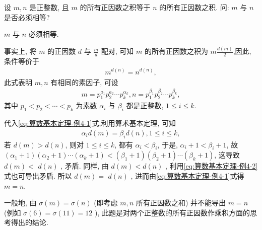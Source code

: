 \begin{example}
	设 $m ,  n$ 是正整数, 且 $m$ 的所有正因数之积等于 $n$ 的所有正因数之积. 问: $m$ 与 $n$ 是否必须相等?
\end{example}
\begin{solution}
	$m$ 与 $n$ 必须相等.

	事实上, 将 $m$ 的正因数 $d$ 与 $\frac{m}{d}$ 配对, 可知 $m$ 的所有正因数之积为 $m \frac{d(m)}{2}$,因此, 条件等价于
	\begin{align}\label{eq:算数基本定理-例4-1}
		m^{d(n)}=n^{d(n)},
	\end{align}
	此式表明 $m ,  n$ 有相同的素因子, 可设
	\begin{align*}
		m=p_{1}^{a_{1}} p_{2}^{a_{2}} \cdots p_{k}^{\alpha_{k}}, n=p_{1}^{\beta_{1}} p_{2}^{\beta_{2}} \cdots p_{k}^{\beta_{k}},
	\end{align*}
	其中 $p_{1}<p_{2}<\cdots<p_{k}$ 为素数 $\alpha_{i}$ 与 $\beta_{i}$ 都是正整数, $1 \leqslant i \leqslant k$.

	代入\ref{eq:算数基本定理-例4-1}式,利用算术基本定理, 可知
	\begin{align}\label{eq:算数基本定理-例4-2}
		\alpha_{i} d(m)=\beta_{i} d(n), 1 \leqslant i \leqslant k,
	\end{align}
	若 $d(m)>d(n)$, 则对 $1 \leqslant i \leqslant k$, 都有 $\alpha_{i}<\beta_{i}$, 于是, $\alpha_{i}+1<\beta_{i}+1$, 故 $\left(\alpha_{1}+1\right)\left(\alpha_{2}+1\right) \cdots\left(\alpha_{k}+1\right)<\left(\beta_{1}+1\right)\left(\beta_{2}+1\right) \cdots\left(\beta_{k}+1\right)$, 这导致 $d(m)<$ $d(n)$ , 矛盾. 同样, 由 $d(m)<d(n)$ , 利用\ref{eq:算数基本定理-例4-2}式也可导出矛盾. 所以 $d(m)=$ $d(n)$ , 进而由\ref{eq:算数基本定理-例4-1}式得 $m=n$.
\end{solution}
\begin{note}
	一般地, 由 $\sigma(m)=\sigma(n)$ (即考虑 $m ,  n$ 所有正因数之和) 并不能导出 $m=n$ (例如 $\sigma(6)=\sigma(11)=12$ ), 此题是对两个正整数的所有正因数作乘积方面的思考得出的结论.
\end{note}

